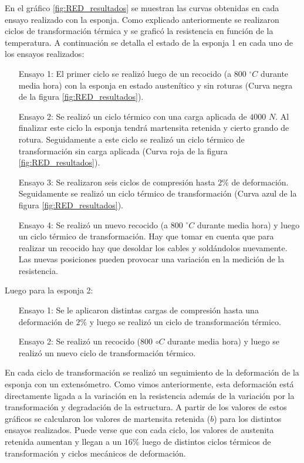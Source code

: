 \documentclass[a4paper,12pt,fleqn,twoside,openany]{book}
\begin{document}
En el gráfico \ref{fig:RED_resultados} se muestran las curvas obtenidas en cada ensayo realizado con la esponja. Como explicado anteriormente se realizaron ciclos de transformación térmica y se graficó la resistencia en función de la temperatura. A continuación se detalla el estado de la esponja 1 en cada uno de los ensayos realizados: 
\begin{itemize}
 \item[Ensayo 1:] El primer ciclo se realizó luego de un recocido (a $800$ $^\circ C$ durante media hora) con la esponja en estado austenítico y sin roturas (Curva negra de la figura \ref{fig:RED_resultados}).
 \item[Ensayo 2:] Se realizó un ciclo térmico con una carga aplicada de $4000$ $N$. Al finalizar este ciclo la esponja tendrá martensita retenida y cierto grando de rotura. Seguidamente a este ciclo se realizó un ciclo térmico de transformación sin carga aplicada (Curva roja de la figura \ref{fig:RED_resultados}).
 \item[Ensayo 3:] Se realizaron seis ciclos de compresión hasta $2\%$ de deformación. Seguidamente se realizó un ciclo térmico de transformación (Curva azul de la figura \ref{fig:RED_resultados}).
 \item[Ensayo 4:] Se realizó un nuevo recocido (a $800$ $^\circ C$ durante media hora) y luego un ciclo térmico de transformación. Hay que tomar en cuenta que para realizar un recocido hay que desoldar los cables y soldándolos nuevamente. Las nuevas posiciones pueden provocar una variación en la medición de la resistencia.
 \end{itemize}
Luego para la esponja 2:
\begin{itemize}
 \item[Ensayo 1:] Se le aplicaron distintas cargas de compresión hasta una deformación de $2\%$ y luego se realizó un ciclo de transformación térmico.
 \item[Ensayo 2:] Se realizó un recocido ($800$ $\circ C$ durante media hora) y luego se realizó un nuevo ciclo de transformación térmico.
\end{itemize}


En cada ciclo de transformación se realizó un seguimiento de la deformación de la esponja con un extensómetro. Como vimos anteriormente, esta deformación está directamente ligada a la variación en la resistencia además de la variación por la transformación y degradación de la estructura. A partir de los valores de estos gráficos   
se calcularon los valores de martensita retenida ($b$) para los distintos ensayos realizados. Puede verse que con cada ciclo, los valores de austenita retenida aumentan y llegan a un $16\%$ luego de distintos ciclos térmicos de transformación y ciclos mecánicos de deformación. 
\end{document}
